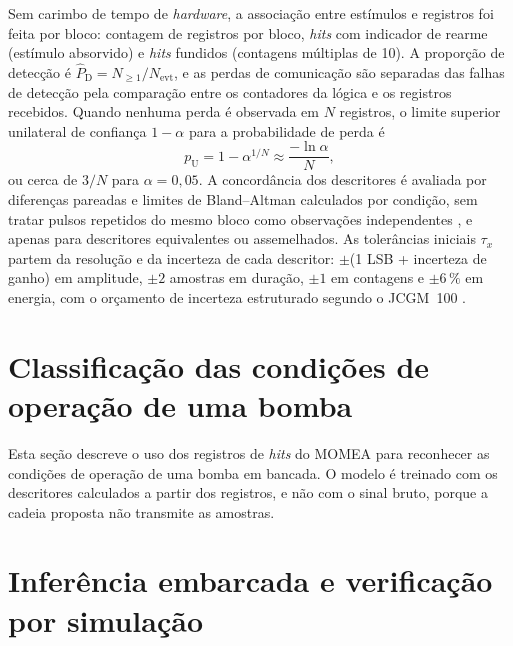 Sem carimbo de tempo de \textit{hardware}, a associação entre estímulos e registros foi feita por bloco: contagem de registros por bloco, \textit{hits} com indicador de rearme (estímulo absorvido) e \textit{hits} fundidos (contagens múltiplas de 10). A proporção de detecção é \(\widehat{P}_{\mathrm{D}} = N_{\ge 1}/N_{\mathrm{evt}}\), e as perdas de comunicação são separadas das falhas de detecção pela comparação entre os contadores da lógica e os registros recebidos. Quando nenhuma perda é observada em \(N\) registros, o limite superior unilateral de confiança \(1-\alpha\) para a probabilidade de perda é
\begin{equation}
	p_{\mathrm{U}} = 1 - \alpha^{1/N} \approx \frac{-\ln\alpha}{N},
	\label{v2:eq:limite_zero_falhas}
\end{equation}
ou cerca de \(3/N\) para \(\alpha = 0{,}05\). A concordância dos descritores é avaliada por diferenças pareadas e limites de Bland--Altman calculados por condição, sem tratar pulsos repetidos do mesmo bloco como observações independentes \cite{bland1986,bland1999}, e apenas para descritores equivalentes ou assemelhados. As tolerâncias iniciais \(\tau_x\) partem da resolução e da incerteza de cada descritor: \(\pm\)(1 LSB + incerteza de ganho) em amplitude, \(\pm 2\) amostras em duração, \(\pm 1\) em contagens e \(\pm 6\,\%\) em energia, com o orçamento de incerteza estruturado segundo o JCGM~100 \cite{jcgm2008}.

\section{Classificação das condições de operação de uma bomba}
\label{sec:mm_bomba}

Esta seção descreve o uso dos registros de \textit{hits} do MOMEA para reconhecer as condições de operação de uma bomba em bancada. O modelo é treinado com os descritores calculados a partir dos registros, e não com o sinal bruto, porque a cadeia proposta não transmite as amostras.



\section{Inferência embarcada e verificação por simulação}
\label{sec:mm_embarcado}

